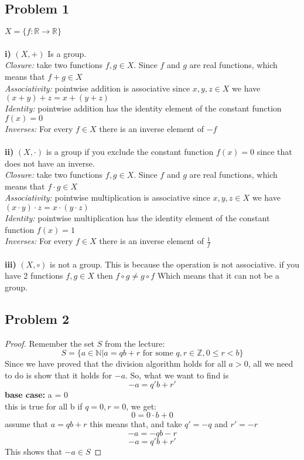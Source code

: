 \documentclass[12pt]{article}
\newcommand{\N}{\mathbb{N}}
\newcommand{\Z}{\mathbb{Z}}
\newcommand{\R}{\mathbb{R}}
\begin{document}


\subsection*{Problem 1}
$X = \{ f:\R \rightarrow	\R \}$\\\\
\textbf{i)} $(X,+)$ Is a group. \\
\textit{Closure:} take two functions $f,g \in X$. Since $f$ and $g$ are real functions, which means that $f+g \in X$ \\
\textit{Associativity:} pointwise addition is associative since $x,y,z \in X$ we have $(x+y)+z = x+(y+z)$\\
\textit{Identity:} pointwise addition has the identity element of the constant function $f(x) = 0$\\
\textit{Inverses:} For every $f \in X$ there is an inverse element of $-f$\\
\\
\textbf{ii)} $(X, \cdot )$ is a group if you exclude the constant function $f(x) = 0$ since that does not have an inverse.\\
\textit{Closure:} take two functions $f,g \in X$. Since $f$ and $g$ are real functions, which means that $f \cdot g \in X$ \\
\textit{Associativity:} pointwise multiplication is associative since $x,y,z \in X$ we have $(x \cdot y) \cdot z = x\cdot (y \cdot z)$\\
\textit{Identity:} pointwise multiplication has the identity element of the constant function $f(x) = 1$\\
\textit{Inverses:} For every $f \in X$ there is an inverse element of $\frac{1}{f}$\\
\\
\textbf{iii)} $(X, \circ )$ is not a group. This is because the operation is not associative. if you have 2 functions $f,g \in X$ then $f \circ g \neq g \circ f$ Which means that it can not be a group.\\
\newpage
\subsection*{Problem 2}

\begin{proof}
Remember the set $S$ from the lecture:\\
\[
	S = \{ a \in \N | a=qb+r \text{ for some } q,r \in \Z , 0 \leq r < b \}
\]
Since we have proved that the division algorithm holds for all $a > 0$, all we need to do is show that it holds for $-a$. So, what we want to find is\\
\[
	-a = q'b + r'
\]
\textbf{base case:} a = 0\\
this is true for all b if $q=0,r=0$, we get:\\
\[
	0 = 0 \cdot b + 0
\]
assume that $a = qb+r$ this means that, and take $q'=-q$ and $r'=-r$\\
\[
	-a = -qb-r
\]\[
	-a = q'b+r'
\]
This shows that $-a \in S$
\end{proof}
\end{document}
